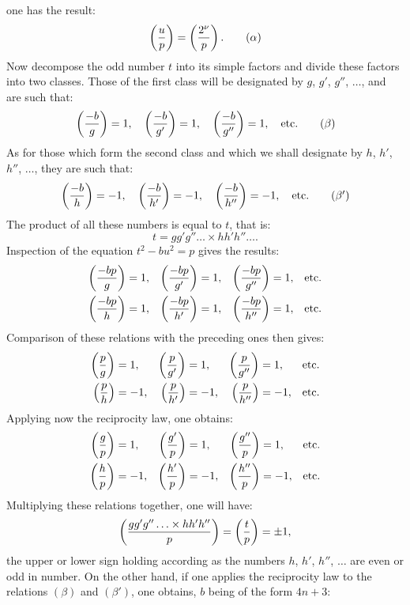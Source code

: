 \noindent
one has the result:
\begin{equation*}
\left(\frac{u}{p}\right)=\left(\frac{2^\nu}{p}\right).\tag{$\alpha$}
\end{equation*}
Now decompose the odd number $t$ into its simple factors and divide these
factors into two classes. Those of the first class will be designated by $g$,
$g'$, $g''$, $\ldots$, and are such that:
\begin{equation*}
\left(\frac{-b}{g}\right)=1,\quad\left(\frac{-b}{g'}\right)=1,\quad\left(\frac{-b}{g''}\right)=1,\quad\text{etc.}\tag{$\beta$}
\end{equation*}
As for those which form the second class and which we shall designate by $h$,
$h'$, $h''$, $\ldots$, they are such that:
\begin{equation*}
\left(\frac{-b}{h}\right)=-1,\quad\left(\frac{-b}{h'}\right)=-1,\quad\left(\frac{-b}{h''}\right)=-1,\quad\text{etc.}\tag{$\beta'$}
\end{equation*}
The product of all these numbers is equal to $t$, that is:
\[
t=gg'g''\ldots\times hh'h''\ldots.
\]
Inspection of the equation $t^2-bu^2=p$ gives the results:
\[
\begin{aligned}
\left(\frac{-bp}{g}\right)&=1, &\left(\frac{-bp}{g'}\right)&=1, &\left(\frac{-bp}{g''}\right)&=1, &\text{etc.}\\
\left(\frac{-bp}{h}\right)&=1, &\left(\frac{-bp}{h'}\right)&=1, &\left(\frac{-bp}{h''}\right)&=1, &\text{etc.}
\end{aligned}
\]
Comparison of these relations with the preceding ones then gives:
\[
\begin{aligned}
\left(\frac{p}{g}\right)&=1, &\left(\frac{p}{g'}\right)&=1, &\left(\frac{p}{g''}\right)&=1, &\text{etc.}\\
\left(\frac{p}{h}\right)&=-1, &\left(\frac{p}{h'}\right)&=-1, &\left(\frac{p}{h''}\right)&=-1, &\text{etc.}
\end{aligned}
\]
Applying now the reciprocity law, one obtains:
\[
\begin{aligned}
\left(\frac{g}{p}\right)&=1, &\left(\frac{g'}{p}\right)&=1, &\left(\frac{g''}{p}\right)&=1, &\text{etc.}\\
\left(\frac{h}{p}\right)&=-1, &\left(\frac{h'}{p}\right)&=-1, &\left(\frac{h''}{p}\right)&=-1, &\text{etc.}
\end{aligned}
\]
Multiplying these relations together, one will have:
\[
\left(\frac{gg'g''\ldots\times hh'h''}{p}\right)=\left(\frac{t}{p}\right)=\pm1,
\]
the upper or lower sign holding according as the numbers $h$, $h'$, $h''$, $\ldots$
are even or odd in number. On the other hand, if one applies the reciprocity
law to the relations $(\beta)$ and $(\beta')$, one obtains, $b$ being of the form $4n+3$:
